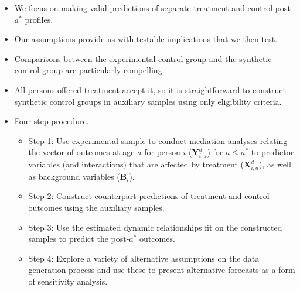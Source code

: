 \documentclass[static]{JJH-Beamer}
\begin{document}
\begin{frame}

\begin{itemize}
\item We focus on making valid predictions of separate treatment and control post-$a^*$ profiles.
\item Our assumptions provide us with testable implications that we then test.
\item Comparisons between the experimental control group and the synthetic control group are particularly compelling.
\item All persons offered treatment accept it, so it is straightforward to construct synthetic control groups in auxiliary samples using only eligibility criteria.
\end{itemize}

\end{frame}

\begin{frame}

\begin{itemize}
\item Four-step procedure.
    \begin{itemize}
    \item Step 1: Use experimental sample to conduct mediation analyses relating the vector of outcomes at age $a$ for person $i$ ($\bm{Y}^{d}_{i,a}$) for $a\leq a^*$ to predictor variables (and interactions) that are affected by treatment ($\bm{X}^{d}_{i,a}$), as well as background variables ($\bm{B}_i$).
    \item Step 2: Construct counterpart predictions of treatment and control outcomes using the auxiliary samples.
    \item Step 3: Use the estimated dynamic relationships fit on the constructed samples to predict the post-$a^{\ast}$ outcomes.
    \item Step 4: Explore a variety of alternative assumptions on the data generation process and use these to present alternative forecasts as a form of sensitivity analysis.
    \end{itemize}
\end{itemize}

\end{frame}
\clearpage
\end{document}
